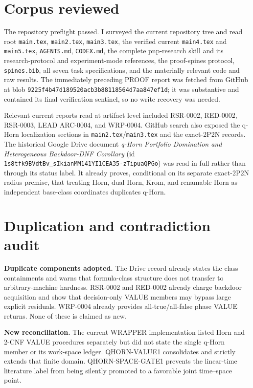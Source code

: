\documentclass[11pt]{article}
\begin{document}
\section{Corpus reviewed}
The repository preflight passed.  I surveyed the current repository tree and
read root \texttt{main.tex}, \texttt{main2.tex}, \texttt{main3.tex}, the
verified current \texttt{main4.tex} and \texttt{main5.tex},
\texttt{AGENTS.md}, \texttt{CODEX.md}, the complete pnp-research skill and
its research-protocol and experiment-mode references, the proof-spines
protocol, \texttt{spines.bib}, all seven task specifications, and the
materially relevant code and raw results.  The immediately preceding PROOF
report
was fetched from GitHub at blob
\texttt{9225f4b47d189520acb3b88118564d7aa847ef1d}; it was substantive and
contained its final verification sentinel, so no write recovery was needed.

Relevant current reports read at artifact level included RSR-0002,
RED-0002, RSR-0003, LEAD ARC-0004, and WRP-0004.  GitHub search also exposed
the q-Horn localization sections in \texttt{main2.tex}/\texttt{main3.tex}
and the exact-2P2N records.  The historical Google Drive document
\emph{q-Horn Portfolio Domination and Heterogeneous Backdoor-DNF Corollary}
(id \texttt{1s8tfk9BVdtBv\_sIkianMM141YI1CEA35-zTipuaQPGo}) was read in
full rather than through its status label.  It already proves, conditional on
its separate exact-2P2N radius premise, that treating Horn, dual-Horn, Krom,
and renamable Horn as independent base-class coordinates duplicates q-Horn.

\section{Duplication and contradiction audit}
\textbf{Duplicate components adopted.}  The Drive record already states the
class containments and warns that formula-class structure does not transfer
to arbitrary-machine hardness.  RSR-0002 and RED-0002 already charge
backdoor acquisition and show that decision-only VALUE members may bypass
large explicit residuals.  WRP-0004 already provides all-true/all-false phase
VALUE returns.  None of these is claimed as new.

\textbf{New reconciliation.}  The current WRAPPER implementation listed
Horn and 2-CNF VALUE procedures separately but did not state the single
q-Horn member or its work-space ledger.  QHORN-VALUE1 consolidates and
strictly extends that finite domain.  QHORN-SPACE-GATE1 prevents the
linear-time literature label from being silently promoted to a favorable
joint time--space point.
\end{document}
